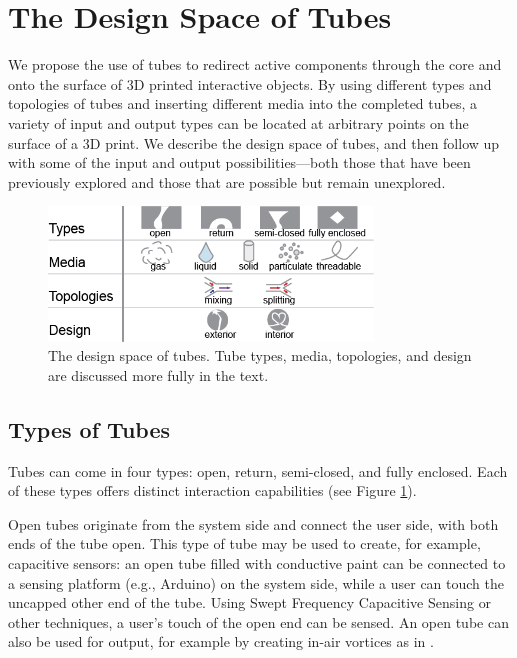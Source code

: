 \section{The Design Space of Tubes}

We propose the use of tubes to redirect active components through the core and onto the surface of 3D printed interactive objects.  By using different types and topologies of tubes and inserting different media into the completed tubes, a variety of input and output types  can be located at arbitrary points on the surface of a 3D print.  We describe the design space of tubes, and then follow up with some of the input and output possibilities---both those that have been previously explored and those that are possible but remain unexplored.

\begin{figure}[h]
\centering
    \includegraphics[width=3.4in]{figures/tubespace.png}
\caption{The design space of tubes.  Tube types, media, topologies, and design are discussed more fully in the text.}
\label{fig:tubespace}
\end{figure}

\subsection{Types of Tubes}

Tubes can come in four types: open, return, semi-closed, and fully enclosed.  Each of these types offers distinct interaction capabilities (see Figure \ref{fig:tubespace}).

Open tubes originate from the system side and connect the user side, with both ends of the tube open.   This type of tube may be used to create, for example, capacitive sensors: an open tube filled with conductive paint can be connected to a sensing platform (e.g., Arduino) on the system side, while a user can touch the uncapped other end of the tube.  Using Swept Frequency Capacitive Sensing \cite{Sato-touche} or other techniques, a user's touch of the open end can be sensed.  An open tube can also be used for output, for example by creating in-air vortices as in \cite{Sodhi-aireal}.

